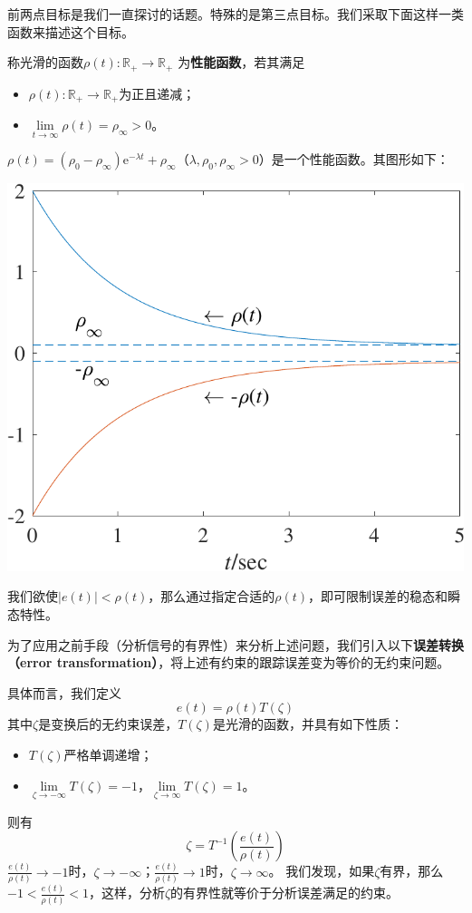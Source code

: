 前两点目标是我们一直探讨的话题。特殊的是第三点目标。我们采取下面这样一类函数来描述这个目标。
\begin{definition}\label{performance_func}
   称光滑的函数$\rho(t):\mathbb{R}_+\to\mathbb{R}_+$
   为{\bf 性能函数}，若其满足
   \begin{itemize}[leftmargin=1em]
    \item $\rho(t):\mathbb{R}_+\to\mathbb{R}_+$为正且递减；
    \item $\lim\limits_{t\to\infty}\rho(t)=\rho_\infty>0$。
\end{itemize}
\end{definition}
\newpage
\begin{example}[性能函数]
   $\rho(t)=(\rho_0-\rho_{\infty})\mathrm{e}^{-\lambda t}+\rho_\infty$（$\lambda,\rho_0,\rho_{\infty}>0$）是一个性能函数。其图形如下：
   \begin{center}
       \includegraphics[scale=0.6]{figure/adaptive/p.pdf}
       \captionsetup{hypcap=false}
   \end{center}
\end{example}
我们欲使$|e(t)|<\rho(t)$，那么通过指定合适的$\rho(t)$，即可限制误差的稳态和瞬态特性。

为了应用之前手段（分析信号的有界性）来分析上述问题，我们引入以下{\bf 误差转换（error transformation）}，将上述有约束的跟踪误差变为等价的无约束问题。

具体而言，我们定义\[e(t)=\rho(t)T(\zeta)\]
其中$\zeta$是变换后的无约束误差，$T(\zeta)$是光滑的函数，并具有如下性质：
\begin{itemize}[leftmargin=1em]
    \item $T(\zeta)$严格单调递增；
    \item $\lim\limits_{\zeta\to-\infty}T(\zeta)=-1$，$\lim\limits_{\zeta\to\infty}T(\zeta)=1$。
\end{itemize}
则有
\[\zeta = T^{-1}\left(\frac{e(t)}{\rho(t)}\right)\]
$\frac{e(t)}{\rho(t)}\to -1$时，$\zeta\to-\infty$；$\frac{e(t)}{\rho(t)}\to 1$时，$\zeta\to\infty$。
我们发现，如果$\zeta$有界，那么$-1<\frac{e(t)}{\rho(t)}<1$，这样，分析$\zeta$的有界性就等价于分析误差满足的约束。

